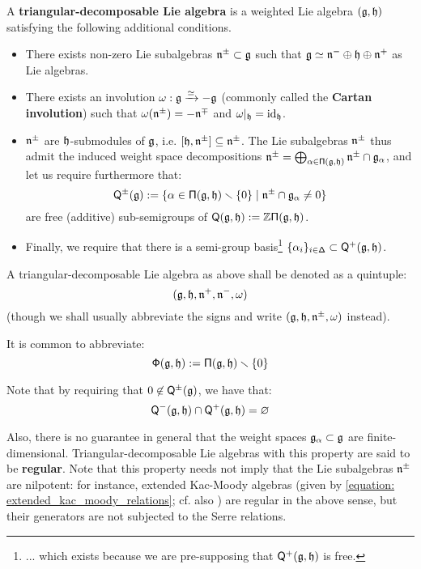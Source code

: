         \begin{definition} \label{def: triangular_decomposable_lie_algebras}
            A \textbf{triangular-decomposable Lie algebra} is a weighted Lie algebra $(\mathfrak{g}, \mathfrak{h})$ satisfying the following additional conditions.
            \begin{itemize}
                \item There exists non-zero Lie subalgebras $\mathfrak{n}^{\pm} \subset \mathfrak{g}$ such that $\mathfrak{g} \simeq \mathfrak{n}^- \oplus \mathfrak{h} \oplus \mathfrak{n}^+$ as Lie algebras.
                \item There exists an involution $\omega: \mathfrak{g} \xrightarrow[]{\simeq} -\mathfrak{g}$ (commonly called the \textbf{Cartan involution}) such that $\omega(\mathfrak{n}^{\pm}) = -\mathfrak{n}^{\mp}$ and $\omega|_{\mathfrak{h}} = \mathrm{id}_{\mathfrak{h}}$.
                \item $\mathfrak{n}^{\pm}$ are $\mathfrak{h}$-submodules of $\mathfrak{g}$, i.e. $[\mathfrak{h}, \mathfrak{n}^{\pm}] \subseteq \mathfrak{n}^{\pm}$. The Lie subalgebras $\mathfrak{n}^{\pm}$ thus admit the induced weight space decompositions $\mathfrak{n}^{\pm} = \bigoplus_{\alpha \in \mathsf{\Pi}(\mathfrak{g}, \mathfrak{h})} \mathfrak{n}^{\pm} \cap \mathfrak{g}_{\alpha}$, and let us require furthermore that:
                    $$\mathsf{Q}^{\pm}(\mathfrak{g}) := \{ \alpha \in \mathsf{\Pi}(\mathfrak{g}, \mathfrak{h}) \smallsetminus \{0\} \mid \mathfrak{n}^{\pm} \cap \mathfrak{g}_{\alpha} \not = 0 \}$$
                are free (additive) sub-semigroups of $\mathsf{Q}(\mathfrak{g}, \mathfrak{h}) := \mathbb{Z}\mathsf{\Pi}(\mathfrak{g}, \mathfrak{h})$.
                \item Finally, we require that there is a semi-group basis\footnote{... which exists because we are pre-supposing that $\mathsf{Q}^+(\mathfrak{g}, \mathfrak{h})$ is free.} $\{\alpha_i\}_{i \in \mathsf{\Delta}} \subset \mathsf{Q}^+(\mathfrak{g}, \mathfrak{h})$.
            \end{itemize}
            A triangular-decomposable Lie algebra as above shall be denoted as a quintuple:
                $$(\mathfrak{g}, \mathfrak{h}, \mathfrak{n}^+, \mathfrak{n}^-, \omega)$$
            (though we shall usually abbreviate the signs and write $(\mathfrak{g}, \mathfrak{h}, \mathfrak{n}^{\pm}, \omega)$ instead).
        \end{definition}
        \begin{convention}
            It is common to abbreviate:
                $$\mathsf{\Phi}(\mathfrak{g}, \mathfrak{h}) := \mathsf{\Pi}(\mathfrak{g}, \mathfrak{h}) \smallsetminus \{0\}$$
        \end{convention}
        \begin{remark}
            Note that by requiring that $0 \not \in \mathsf{Q}^{\pm}(\mathfrak{g})$, we have that:
                $$\mathsf{Q}^-(\mathfrak{g}, \mathfrak{h}) \cap \mathsf{Q}^+(\mathfrak{g}, \mathfrak{h}) = \varnothing$$

            Also, there is no guarantee in general that the weight spaces $\mathfrak{g}_{\alpha} \subset \mathfrak{g}$ are finite-dimensional. Triangular-decomposable Lie algebras with this property are said to be \textbf{regular}. Note that this property needs not imply that the Lie subalgebras $\mathfrak{n}^{\pm}$ are nilpotent: for instance, extended Kac-Moody algebras (given by \eqref{equation: extended_kac_moody_relations}; cf. also \cite[Theorem 1.2]{kac_infinite_dimensional_lie_algebras}) are regular in the above sense, but their generators are not subjected to the Serre relations.
        \end{remark}
